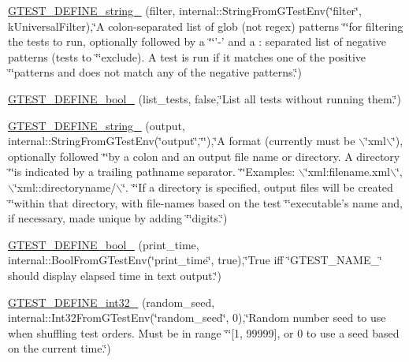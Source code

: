 \begin{DoxyCompactItemize}
\item 
\hyperlink{namespacetesting_a7707345ca1fd050c4ae9d3315fe175b7}{\-G\-T\-E\-S\-T\-\_\-\-D\-E\-F\-I\-N\-E\-\_\-string\-\_\-} (filter, internal\-::\-String\-From\-G\-Test\-Env(\char`\"{}filter\char`\"{}, k\-Universal\-Filter),\char`\"{}\-A colon-\/separated list of glob (not regex) patterns \char`\"{}\char`\"{}for filtering the tests to run, optionally followed by a \char`\"{}\char`\"{}'-\/' and a \-: separated list of negative patterns (tests to \char`\"{}\char`\"{}exclude).  \-A test is run if it matches one of the positive \char`\"{}\char`\"{}patterns and does not match any of the negative patterns.\char`\"{})
\item 
\hyperlink{namespacetesting_a3d8df49ecaf4f410df3f89fab8ad0271}{\-G\-T\-E\-S\-T\-\_\-\-D\-E\-F\-I\-N\-E\-\_\-bool\-\_\-} (list\-\_\-tests, false,\char`\"{}\-List all tests without running them.\char`\"{})
\item 
\hyperlink{namespacetesting_a94af6ef4c969db54d3e40f42328eb753}{\-G\-T\-E\-S\-T\-\_\-\-D\-E\-F\-I\-N\-E\-\_\-string\-\_\-} (output, internal\-::\-String\-From\-G\-Test\-Env(\char`\"{}output\char`\"{},\char`\"{}\char`\"{}),\char`\"{}\-A format (currently must be $\backslash$\char`\"{}xml$\backslash$\char`\"{}), optionally followed \char`\"{}\char`\"{}by a colon and an output file name or directory. \-A directory \char`\"{}\char`\"{}is indicated by a trailing pathname separator. \char`\"{}\char`\"{}\-Examples\-: $\backslash$\char`\"{}xml\-:filename.\-xml$\backslash$\char`\"{}, $\backslash$\char`\"{}xml\-::directoryname/$\backslash$\char`\"{}. \char`\"{}\char`\"{}\-If a directory is specified, output files will be created \char`\"{}\char`\"{}within that directory, with file-\/names based on the test \char`\"{}\char`\"{}executable's name and, if necessary, made unique by adding \char`\"{}\char`\"{}digits.\char`\"{})
\item 
\hyperlink{namespacetesting_a61406b2044994025d72ae8ef8b5122fc}{\-G\-T\-E\-S\-T\-\_\-\-D\-E\-F\-I\-N\-E\-\_\-bool\-\_\-} (print\-\_\-time, internal\-::\-Bool\-From\-G\-Test\-Env(\char`\"{}print\-\_\-time\char`\"{}, true),\char`\"{}\-True iff \char`\"{}\-G\-T\-E\-S\-T\-\_\-\-N\-A\-M\-E\-\_\-\char`\"{} should display elapsed time in text output.\char`\"{})
\item 
\hyperlink{namespacetesting_a61bb802d0fec79227ae5d0d57d6d0960}{\-G\-T\-E\-S\-T\-\_\-\-D\-E\-F\-I\-N\-E\-\_\-int32\-\_\-} (random\-\_\-seed, internal\-::\-Int32\-From\-G\-Test\-Env(\char`\"{}random\-\_\-seed\char`\"{}, 0),\char`\"{}\-Random number seed to use when shuffling test orders.  \-Must be in range \char`\"{}\char`\"{}\mbox{[}1, 99999\mbox{]}, or 0 to use a seed based on the current time.\char`\"{})

\end{DoxyCompactItemize}
